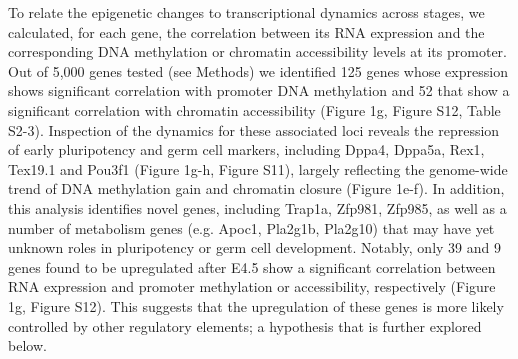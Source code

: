 To relate the epigenetic changes to transcriptional dynamics across stages, we calculated, for each gene, the correlation between its RNA expression and the corresponding DNA methylation or chromatin accessibility levels at its promoter. Out of 5,000 genes tested (see Methods) we identified 125 genes whose expression shows significant correlation with promoter DNA methylation and 52 that show a significant correlation with chromatin accessibility (Figure 1g, Figure S12, Table S2-3). Inspection of the dynamics for these associated loci reveals the repression of early pluripotency and germ cell markers, including Dppa4, Dppa5a, Rex1, Tex19.1 and Pou3f1 (Figure 1g-h, Figure S11), largely reflecting the genome-wide trend of DNA methylation gain and chromatin closure (Figure 1e-f). In addition, this analysis identifies novel genes, including Trap1a, Zfp981, Zfp985, as well as a number of metabolism genes (e.g. Apoc1, Pla2g1b, Pla2g10) that may have yet unknown roles in pluripotency or germ cell development. Notably, only 39 and 9 genes found to be upregulated after E4.5 show a significant correlation between RNA expression and promoter methylation or accessibility, respectively (Figure 1g, Figure S12). This suggests that the upregulation of these genes is more likely controlled by other regulatory elements; a hypothesis that is further explored below.

